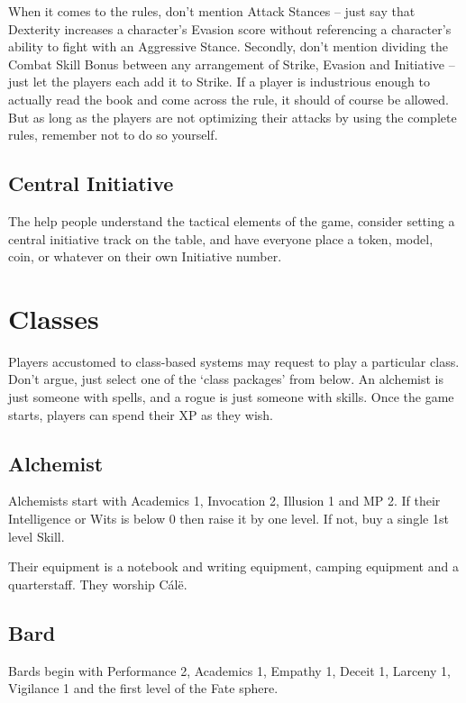 When it comes to the rules, don't mention Attack Stances -- just say that Dexterity increases a character's Evasion score without referencing a character's ability to fight with an Aggressive Stance.  Secondly, don't mention dividing the Combat Skill Bonus between any arrangement of Strike, Evasion and Initiative -- just let the players each add it to Strike. If a player is industrious enough to actually read the book and come across the rule, it should of course be allowed. But as long as the players are not optimizing their attacks by using the complete rules, remember not to do so yourself.

\subsection{Central Initiative}

The help people understand the tactical elements of the game, consider setting a central initiative track on the table, and have everyone place a token, model, coin, or whatever on their own Initiative number.

\section{Classes}

Players accustomed to class-based systems may request to play a particular class. Don't argue, just select one of the `class packages' from below.  An alchemist is just someone with spells, and a rogue is just someone with skills.  Once the game starts, players can spend their XP as they wish.

\subsection{Alchemist}

Alchemists start with Academics 1, Invocation 2, Illusion 1 and MP 2.  If their Intelligence or Wits is below 0 then raise it by one level.  If not, buy a single 1st level Skill.

Their equipment is a notebook and writing equipment, camping equipment and a quarterstaff. They worship C\'{a}l\"{e}.

\subsection{Bard}

Bards begin with Performance 2, Academics 1, Empathy 1, Deceit 1, Larceny 1, Vigilance 1 and the first level of the Fate sphere.

